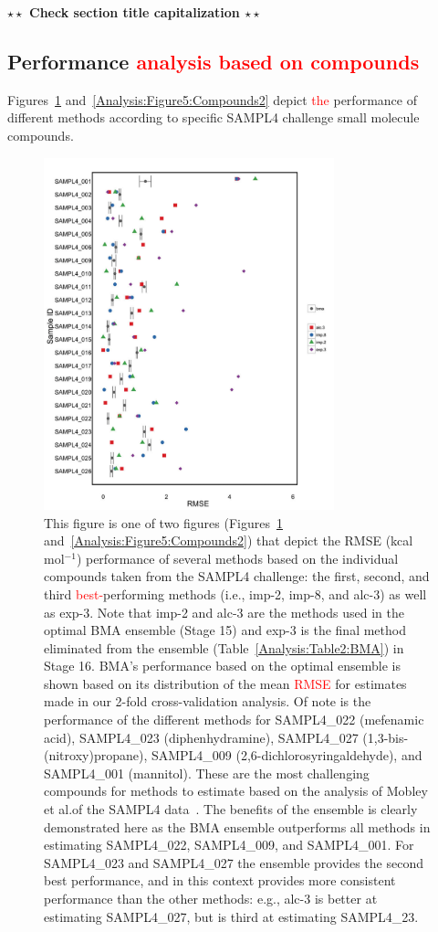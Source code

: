 \documentclass[journal=jpcbfk, manuscript=article]{achemso}
\newcommand{\+}[1]{\ensuremath{\mathbf{#1}}}
\newcommand{\todo}[1]{\textbf{$\star \star$ {#1} $\star \star$}}
\newcommand{\rev}[1]{\textsf{\textcolor{red}{#1}}}
\begin{document}
\todo{Check section title capitalization}
\subsection{Performance \rev{analysis based on compounds}}
\label{Results:BMA_Molecules}
Figures~\ref{Analysis:Figure4:Compounds1} and~\ref{Analysis:Figure5:Compounds2} depict \rev{the} performance of different methods according to specific SAMPL4 challenge small molecule compounds.
\begin{figure}
	\centering
	\includegraphics[keepaspectratio,width=0.75\textwidth]{Figures/Rev2/error_bar_plot_no_best_split_1}
	\caption{This figure is one of two figures (Figures~\ref{Analysis:Figure4:Compounds1} and~\ref{Analysis:Figure5:Compounds2}) that depict the RMSE (kcal mol$^{-1}$) performance of several methods based on the individual compounds taken from the SAMPL4 challenge: the first, second, and third \rev{best-}performing methods (i.e., imp-2, imp-8, and alc-3) as well as exp-3.
	Note that imp-2 and alc-3 are the methods used in the optimal BMA ensemble (Stage 15) and exp-3 is the final method eliminated from the ensemble (Table~\ref{Analysis:Table2:BMA}) in Stage 16.
	BMA's performance based on the optimal ensemble is shown based on its distribution of the mean \rev{RMSE} for estimates made in our 2-fold cross-validation analysis.
	Of note is the performance of the different methods for SAMPL4\_022 (mefenamic acid), SAMPL4\_023 (diphenhydramine), SAMPL4\_027 (1,3-bis-(nitroxy)propane), SAMPL4\_009 (2,6-dichlorosyringaldehyde), and SAMPL4\_001 (mannitol).
	These are the most challenging compounds for methods to estimate based on the analysis of Mobley et al.\@ of the SAMPL4 data~\cite{Mobley:2014}.
	The benefits of the ensemble is clearly demonstrated here as the BMA ensemble outperforms all methods in estimating SAMPL4\_022, SAMPL4\_009, and SAMPL4\_001.
	For SAMPL4\_023 and SAMPL4\_027 the ensemble provides the second best performance, and in this context provides more consistent performance than the other methods: e.g., alc-3 is better at estimating SAMPL4\_027, but is third at estimating SAMPL4\_23.}
\label{Analysis:Figure4:Compounds1}
\end{figure}
\end{document}
